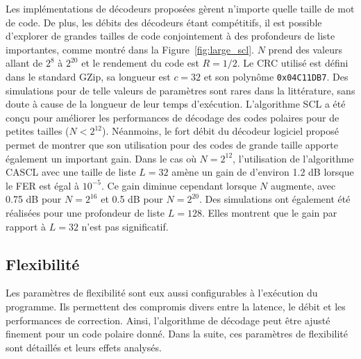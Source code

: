 Les implémentations de décodeurs proposées gèrent n'importe quelle taille de mot de code. De plus, les débits des décodeurs étant compétitifs, il est possible d'explorer de grandes tailles de code conjointement à des profondeurs de liste importantes, comme montré dans la Figure~\ref{fig:large_scl}. $N$ prend des valeurs allant de $2^8$ à $2^{20}$ et le rendement du code est $R=1/2$. Le CRC utilisé est défini dans le standard GZip, sa longueur est $c=32$ et son polynôme \texttt{0x04C11DB7}. Des simulations pour de telle valeurs de paramètres sont rares dans la littérature, sans doute à cause de la longueur de leur temps d'exécution. L'algorithme SCL a été conçu pour améliorer les performances de décodage des codes polaires pour de petites tailles ($N<2^{12}$). Néanmoins, le fort débit du décodeur logiciel proposé permet de montrer que son utilisation pour des codes de grande taille apporte également un important gain. Dans le cas où $N=2^{12}$, l'utilisation de l'algorithme CASCL avec une taille de liste $L=32$ amène un gain de d'environ 1.2 dB lorsque le FER est égal à $10^{-5}$. Ce gain diminue cependant lorsque $N$ augmente, avec 0.75 dB pour $N=2^{16}$ et 0.5 dB pour $N=2^{20}$. Des simulations ont également été réalisées pour une profondeur de liste $L=128$. Elles montrent que le gain par rapport à $L=32$ n'est pas significatif.

\subsection{Flexibilité}
Les paramètres de flexibilité sont eux aussi configurables à l'exécution du programme. Ils permettent des compromis divers entre la latence, le débit et les performances de correction. Ainsi, l'algorithme de décodage peut être ajusté finement pour un code polaire donné. Dans la suite, ces paramètres de flexibilité sont détaillés et leurs effets analysés.

